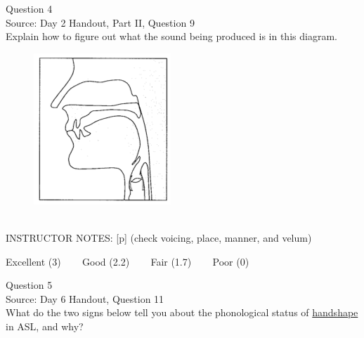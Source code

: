 \documentclass[12pt]{article}
\begin{document}
{\large Question 4}\\

Source: Day 2 Handout, Part II, Question 9\\

Explain how to figure out what the sound being produced is in this diagram.\\

\begin{figure}[H]
\includegraphics{../images/sagittal_p.png}
\end{figure}

~\\
INSTRUCTOR NOTES: [p] (check voicing, place, manner, and velum)


\vfill
Excellent (3) ~~~ Good (2.2) ~~~ Fair (1.7) ~~~ Poor (0)
\newpage

{\large Question 5}\\

Source: Day 6 Handout, Question 11\\

What do the two signs below tell you about the phonological status of \underline{handshape} in ASL, and why?\\
\end{document}
